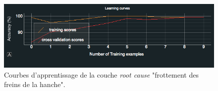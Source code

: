%
\begin{figure}[h]
\centering\includegraphics[width=12cm]{images/courbe_apprentissage.png}
\caption[Courbes d'apprentissage]{Courbes d'apprentissage de la couche \emph{root cause} "frottement des freins de la hanche".}
\label{fig:Courbes d'apprentissage}
\end{figure}